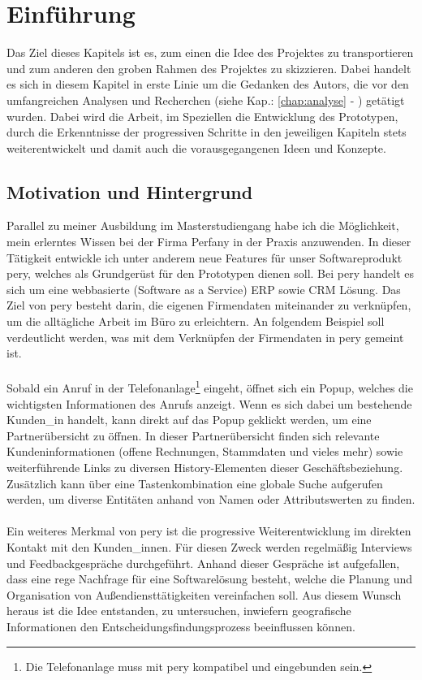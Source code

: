 \documentclass[Bachelorarbeit.tex]{subfiles}
\begin{document}
\chapter{Einführung}
\label{chap:einfuehrung}

Das Ziel dieses Kapitels ist es, zum einen die Idee des Projektes zu transportieren und zum anderen den groben Rahmen des Projektes zu skizzieren.
Dabei handelt es sich in diesem Kapitel in erste Linie um die Gedanken des Autors, die vor den umfangreichen Analysen und Recherchen (siehe Kap.: \ref{chap:analyse} - ) getätigt wurden.
Dabei wird die Arbeit, im Speziellen die Entwicklung des Prototypen, durch die Erkenntnisse der progressiven Schritte in den jeweiligen Kapiteln stets weiterentwickelt und damit auch die vorausgegangenen Ideen und Konzepte.


\section{Motivation und Hintergrund}
\label{chap:einfuehrung:sec:hintergrund}

Parallel zu meiner Ausbildung im Masterstudiengang habe ich die Möglichkeit, mein erlerntes Wissen bei der Firma Perfany in der Praxis anzuwenden.
In dieser Tätigkeit entwickle ich unter anderem neue Features für unser Softwareprodukt pery, welches als Grundgerüst für den Prototypen dienen soll.
Bei pery handelt es sich um eine webbasierte (Software as a Service) \ac{ERP} sowie \ac{CRM} Lösung.
Das Ziel von pery besteht darin, die eigenen Firmendaten miteinander zu verknüpfen, um die alltägliche Arbeit im Büro zu erleichtern.
An folgendem Beispiel soll verdeutlicht werden, was mit dem Verknüpfen der Firmendaten in pery gemeint ist.\\
\\
Sobald ein Anruf in der Telefonanlage\footnote{Die Telefonanlage muss mit pery kompatibel und eingebunden sein.} eingeht, öffnet sich ein Popup, welches die wichtigsten Informationen des Anrufs anzeigt. 
Wenn es sich dabei um bestehende Kunden\_in handelt, kann direkt auf das Popup geklickt werden, um eine Partnerübersicht zu öffnen.
In dieser Partnerübersicht finden sich relevante Kundeninformationen (offene Rechnungen, Stammdaten und vieles mehr) sowie weiterführende Links zu diversen History-Elementen dieser Geschäftsbeziehung.
Zusätzlich kann über eine Tastenkombination eine globale Suche aufgerufen werden, um diverse Entitäten anhand von Namen oder Attributswerten zu finden. \\
\\
Ein weiteres Merkmal von pery ist die progressive Weiterentwicklung im direkten Kontakt mit den Kunden\_innen.
Für diesen Zweck werden regelmäßig Interviews und Feedbackgespräche durchgeführt.
Anhand dieser Gespräche ist aufgefallen, dass eine rege Nachfrage für eine Softwarelösung besteht, welche die Planung und Organisation von Außendiensttätigkeiten vereinfachen soll.
Aus diesem Wunsch heraus ist die Idee entstanden, zu untersuchen, inwiefern geografische Informationen den Entscheidungsfindungsprozess beeinflussen können.
\end{document}
